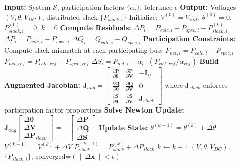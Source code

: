 \documentclass[11pt]{article}
\begin{document}
\begin{algorithm}
\caption{Full Jacobian NR with Integrated Distributed Slack}
\begin{algorithmic}[1]
\STATE \textbf{Input:} System $\mathcal{S}$, participation factors $\{\alpha_i\}$, tolerance $\epsilon$
\STATE \textbf{Output:} Voltages $(V, \theta, V_{DC})$, distributed slack $\{P_{slack,i}\}$
\STATE
\STATE Initialize: $V^{(0)} = V_{init}$, $\theta^{(0)} = 0$, $P_{slack,i}^{(0)} = 0$, $k = 0$
\REPEAT
    \STATE \textbf{Compute Residuals:}
            \STATE $\Delta P_i = P_{calc,i} - P_{spec,i} - P_{slack,i}^{(k)}$
        \ELSE
            \STATE $\Delta P_i = P_{calc,i} - P_{spec,i}$
        \ENDIF
            \STATE $\Delta Q_i = Q_{calc,i} - Q_{spec,i}$
        \ENDIF
    \ENDFOR
    \STATE
    \STATE \textbf{Participation Constraints:}
    \STATE Compute slack mismatch at each participating bus:
        \STATE $P_{net,i} = P_{calc,i} - P_{spec,i}$ 
        \STATE $P_{net,ref} = P_{calc,ref} - P_{spec,ref}$
        \STATE $\Delta S_i = P_{net,i} - \alpha_i \cdot (P_{net,ref} / \alpha_{ref})$ 
    \ENDFOR
    \STATE
    \STATE \textbf{Build Augmented Jacobian:}
    \STATE $\mathbf{J}_{aug} = \begin{bmatrix}
        \frac{\partial \mathbf{P}}{\partial \boldsymbol{\theta}} & \frac{\partial \mathbf{P}}{\partial \mathbf{V}} & -\mathbf{I}_{\mathcal{G}} \\
        \frac{\partial \mathbf{Q}}{\partial \boldsymbol{\theta}} & \frac{\partial \mathbf{Q}}{\partial \mathbf{V}} & \mathbf{0} \\
        \frac{\partial \mathbf{S}}{\partial \boldsymbol{\theta}} & \frac{\partial \mathbf{S}}{\partial \mathbf{V}} & \mathbf{J}_{slack}
    \end{bmatrix}$
    \STATE
    \STATE where $\mathbf{J}_{slack}$ enforces participation factor proportions
    \STATE
    \STATE \textbf{Solve Newton Update:}
    \STATE $\mathbf{J}_{aug} \begin{bmatrix} \Delta \boldsymbol{\theta} \\ \Delta \mathbf{V} \\ \Delta \mathbf{P}_{slack} \end{bmatrix} = -\begin{bmatrix} \Delta \mathbf{P} \\ \Delta \mathbf{Q} \\ \Delta \mathbf{S} \end{bmatrix}$
    \STATE
    \STATE \textbf{Update State:}
    \STATE $\theta^{(k+1)} = \theta^{(k)} + \Delta \theta$
    \STATE $V^{(k+1)} = V^{(k)} + \Delta V$
    \STATE $P_{slack}^{(k+1)} = P_{slack}^{(k)} + \Delta P_{slack}$
    \STATE $k \gets k + 1$
\STATE
\RETURN $(V, \theta, V_{DC})$, $\{P_{slack,i}\}$, converged=$(\|\Delta \mathbf{x}\| < \epsilon)$
\end{algorithmic}
\end{algorithm}
\end{document}
